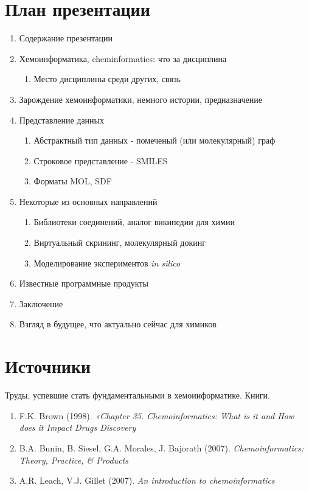 \documentclass[12pt, a4paper]{article}
\begin{document}
\section*{План презентации}

\begin{enumerate}
  \item Содержание презентации
  \item Хемоинформатика, cheminformatics: что за дисциплина
  	 \begin{enumerate}\item Место дисциплины среди других, связь \end{enumerate}
  \item Зарождение хемоинформатики, немного истории, предназначение
  \item Представление данных
	 \begin{enumerate} 
		\item Абстрактный тип данных - помеченый (или молекулярный) граф
		\item Строковое представление - \textsc{SMILES}
		\item Форматы \textsc{MOL, SDF}
	 \end{enumerate}
  \item Некоторые из основных направлений
	 \begin{enumerate}
  		\item Библиотеки соединений, аналог википедии для химии
		\item Виртуальный скрининг, молекулярный докинг
		\item Моделирование экспериментов \emph{in silico}
	 \end{enumerate}
  \item Известные программные продукты
  \item Заключение
  \item Взгляд в будущее, что актуально сейчас для химиков
\end{enumerate}

\section*{Источники}

Труды, успевшие стать фундаментальными в хемоинформатике. Книги.

\begin{enumerate}
  \item F.K. Brown (1998). \emph{«Chapter 35. Chemoinformatics: What is it and How does it Impact Drugs Discovery}
  \item B.A. Bunin, B. Siesel, G.A. Morales, J. Bajorath (2007). \emph{Chemoinformatics: Theory, Practice, \& Products}
  \item A.R. Leach, V.J. Gillet (2007). \emph{An introduction to chemoinformatics}
\end{enumerate}
\end{document}
